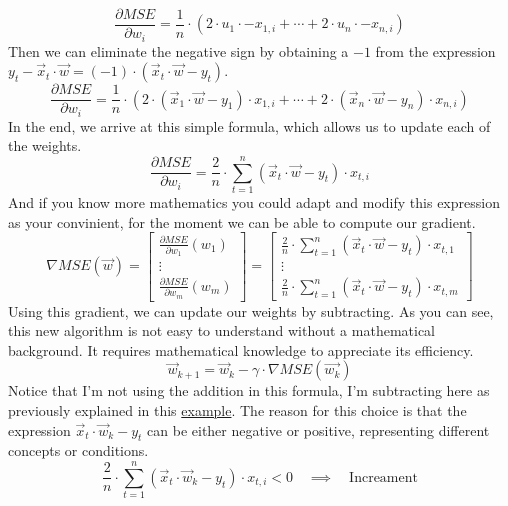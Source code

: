 \[
\frac{\partial MSE}{\partial w_i} = \frac{1}{n} \cdot (
2 \cdot u_1 \cdot - x_{1, i} + \cdots +
2 \cdot u_n \cdot - x_{n, i})
\]
Then we can eliminate the negative sign by obtaining a $-1$ from the expression
$y_t - \vec{x}_t \cdot \vec{w} = (-1) \cdot (\vec{x}_t \cdot \vec{w} - y_t)$.
\[
\frac{\partial MSE}{\partial w_i} = \frac{1}{n} \cdot (
2 \cdot (\vec{x}_1 \cdot \vec{w} - y_1) \cdot x_{1, i} + \cdots +
2 \cdot (\vec{x}_n \cdot \vec{w} - y_n) \cdot x_{n, i})
\]
In the end, we arrive at this simple formula, which allows us to update each of the weights.
\[
\frac{\partial MSE}{\partial w_i} = \frac{2}{n} \cdot \sum_{t = 1}^n(\vec{x}_t \cdot \vec{w} - y_t) \cdot x_{t, i}
\]
And if you know more mathematics you could adapt and modify this expression as your convinient,
for the moment we can be able to compute our gradient.
\[
\nabla MSE(\vec{w}) =
\begin{bmatrix} \frac{\partial MSE}{\partial w_1}(w_1)
  \\ \vdots
  \\ \frac{\partial MSE}{\partial w_m}(w_m)
\end{bmatrix} =
\begin{bmatrix} \frac{2}{n} \cdot \sum_{t = 1}^n(\vec{x}_t \cdot \vec{w} - y_t) \cdot x_{t, 1}
  \\ \vdots
  \\ \frac{2}{n} \cdot \sum_{t = 1}^n(\vec{x}_t \cdot \vec{w} - y_t) \cdot x_{t, m}
\end{bmatrix} 
\]
Using this gradient, we can update our weights by subtracting. As you can see, this new algorithm is not easy
to understand without a mathematical background. It requires mathematical knowledge to appreciate its efficiency.
\[
\vec{w}_{k + 1} = \vec{w}_k - \gamma \cdot \nabla MSE(\vec{w_k})
\]
Notice that I'm not using the addition in this formula, I'm subtracting here as previously explained in this
\hyperref[sec:diving_into_the_algorithm]{example}.
The reason for this choice is that the expression $\vec{x}_t \cdot \vec{w}_k - y_t$
can be either negative or positive, representing different concepts or conditions.
\[
\frac{2}{n} \cdot \sum_{t = 1}^n(\vec{x}_t \cdot \vec{w}_k - y_t) \cdot x_{t, i} < 0\quad \implies \quad
\text{Increament}
\]


